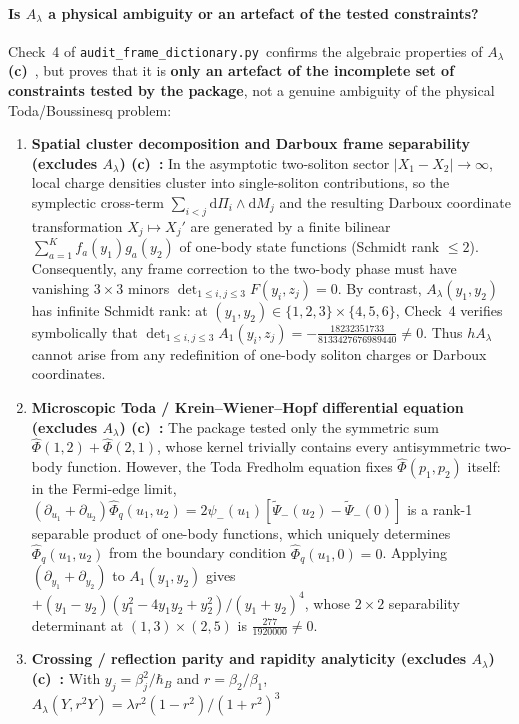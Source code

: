 \documentclass[11pt,a4paper]{article}
\newcommand{\Lc}{\textsf{\textbf{(c)}}\ }
\newcommand{\scr}{\texttt{audit\_\allowbreak frame\_\allowbreak dictionary.py}}
\newcommand{\dd}{\mathrm d}
\begin{document}
\paragraph{Is $A_\lambda$ a physical ambiguity or an artefact of the tested constraints?}
Check~4 of \scr\ confirms the algebraic properties of $A_\lambda$ \Lc, but proves that
it is \textbf{only an artefact of the incomplete set of constraints tested by the
package}, not a genuine ambiguity of the physical Toda/Boussinesq problem:
\begin{enumerate}
\item \textbf{Spatial cluster decomposition and Darboux frame separability (excludes $A_\lambda$) \Lc:}
In the asymptotic two-soliton sector $|X_1-X_2|\to\infty$, local charge densities
cluster into single-soliton contributions, so the symplectic cross-term
$\sum_{i<j}\dd\Pi_i\wedge\dd M_j$ and the resulting Darboux coordinate transformation
$X_j\mapsto X_j'$ are generated by a finite bilinear $\sum_{a=1}^K f_a(y_1)g_a(y_2)$
of one-body state functions (Schmidt rank $\le 2$). Consequently, any frame correction
to the two-body phase must have vanishing $3\times 3$ minors
$\det_{1\le i,j\le 3}F(y_i,z_j)=0$. By contrast, $A_\lambda(y_1,y_2)$ has infinite
Schmidt rank: at $(y_1,y_2)\in\{1,2,3\}\times\{4,5,6\}$, Check~4 verifies symbolically
that $\det_{1\le i,j\le 3}A_1(y_i,z_j)=-\frac{18232351733}{8133427676989440}\ne 0$. Thus $hA_\lambda$
cannot arise from any redefinition of one-body soliton charges or Darboux coordinates.
\item \textbf{Microscopic Toda / Krein--Wiener--Hopf differential equation (excludes $A_\lambda$) \Lc:}
The package tested only the symmetric sum $\widehat\Phi(1,2)+\widehat\Phi(2,1)$,
whose kernel trivially contains every antisymmetric two-body function. However, the
Toda Fredholm equation fixes $\widehat\Phi(p_1,p_2)$ itself: in the Fermi-edge limit,
$(\partial_{u_1}+\partial_{u_2})\widehat\Phi_q(u_1,u_2)=2\psi_-(u_1)[\widetilde\Psi_-(u_2)-\widetilde\Psi_-(0)]$
is a rank-1 separable product of one-body functions, which uniquely determines
$\widehat\Phi_q(u_1,u_2)$ from the boundary condition $\widehat\Phi_q(u_1,0)=0$.
Applying $(\partial_{y_1}+\partial_{y_2})$ to $A_1(y_1,y_2)$ gives
$+(y_1-y_2)(y_1^2-4y_1y_2+y_2^2)/(y_1+y_2)^4$, whose $2\times 2$ separability
determinant at $(1,3)\times(2,5)$ is $\frac{277}{1920000}\ne 0$.
\item \textbf{Crossing / reflection parity and rapidity analyticity (excludes $A_\lambda$) \Lc:}
With $y_j=\beta_j^2/\hbar_B$ and $r=\beta_2/\beta_1$, $A_\lambda(Y,r^2Y)=\lambda r^2(1-r^2)/(1+r^2)^3$

\end{enumerate}
\end{document}
